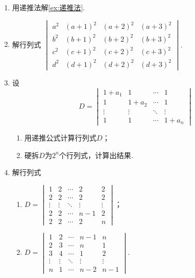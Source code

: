 \begin{enumerate}
    \item 用递推法解\autoref{ex:递推法}.

    \item 解行列式 $ \begin{vmatrix}
                  a^{2} & (a+1)^{2} & (a+2)^{2} & (a+3)^{2} \\
                  b^{2} & (b+1)^{2} & (b+2)^{2} & (b+3)^{2} \\
                  c^{2} & (c+1)^{2} & (c+2)^{2} & (c+3)^{2} \\
                  d^{2} & (d+1)^{2} & (d+2)^{2} & (d+3)^{2}
              \end{vmatrix} $.

    \item 设
          \[ D=\begin{vmatrix}
                  1+a_1  & 1      & \cdots & 1      \\
                  1      & 1+a_2  & \cdots & 1      \\
                  \vdots & \vdots & \ddots & \vdots \\
                  1      & 1      & \cdots & 1+a_n
              \end{vmatrix} \]
          \begin{enumerate}
              \item 用递推公式计算行列式$D$；

              \item 硬拆$D$为$2^n$个行列式，计算出结果.
          \end{enumerate}

    \item 解行列式
          \begin{enumerate}
              \item $D=\begin{vmatrix}
                            1      & 2      & \cdots & 2      & 2      \\
                            2      & 2      & \cdots & 2      & 2      \\
                            \vdots & \vdots & \ddots & \vdots & \vdots \\
                            2      & 2      & \cdots & n-1    & 2      \\
                            2      & 2      & \cdots & 2      & n\end{vmatrix}$；

              \item $D=\begin{vmatrix}
                            1      & 2      & \cdots & n-1    & n      \\
                            2      & 3      & \cdots & n      & 1      \\
                            3      & 4      & \cdots & 1      & 2      \\
                            \vdots & \vdots & \ddots & \vdots & \vdots \\
                            n      & 1      & \cdots & n-2    & n-1
                        \end{vmatrix}$.
          \end{enumerate}


\end{enumerate}
